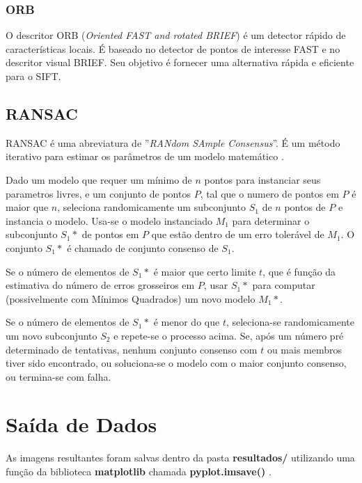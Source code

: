 \documentclass[twoside,twocolumn]{article}
\begin{document}
\subsubsection{ORB}

O descritor ORB (\textit{Oriented FAST and rotated BRIEF}) é um detector rápido de características locais. É baseado no detector de pontos de interesse FAST e no descritor visual BRIEF. Seu objetivo é fornecer uma alternativa rápida e eficiente para o SIFT.

\subsection{RANSAC}

RANSAC é uma abreviatura de ''\textit{RANdom SAmple Consensus}''. É um método iterativo para estimar os parâmetros de um modelo matemático \cite{b4}.

Dado um modelo que requer um mínimo de $n$ pontos para instanciar seus parametros livres, e um conjunto de pontos $P$, tal que o numero de pontos em $P$ é maior que $n$, seleciona randomicamente um subconjunto $S_{1}$ de $n$ pontos de $P$ e instancia o modelo. Usa-se o modelo instanciado $M_{1}$ para determinar o subconjunto $S_{1}*$ de pontos em $P$ que estão dentro de um erro tolerável de $M_{1}$. O conjunto $S_{1}*$ é chamado de conjunto consenso de $S_{1}$.

Se o número de elementos de $S_{1}*$ é maior que certo limite $t$, que é função da estimativa do número de erros grosseiros em $P$, usar $S_{1}*$ para computar (possivelmente com Mínimos Quadrados) um novo modelo $M_{1}*$.

Se o número de elementos de $S_{1}*$ é menor do que $t$, seleciona-se randomicamente um novo subconjunto $S_{2}$ e repete-se o processo acima. Se, após um número pré determinado de tentativas, nenhum conjunto consenso com $t$ ou mais membros tiver sido encontrado, ou soluciona-se o modelo com o maior conjunto consenso, ou termina-se com falha.


\section{Saída de Dados}

As imagens resultantes foram salvas dentro da pasta \textbf{resultados/} utilizando uma função da biblioteca \textbf{matplotlib} chamada \textbf{pyplot.imsave()} \cite{b3}.
\end{document}
